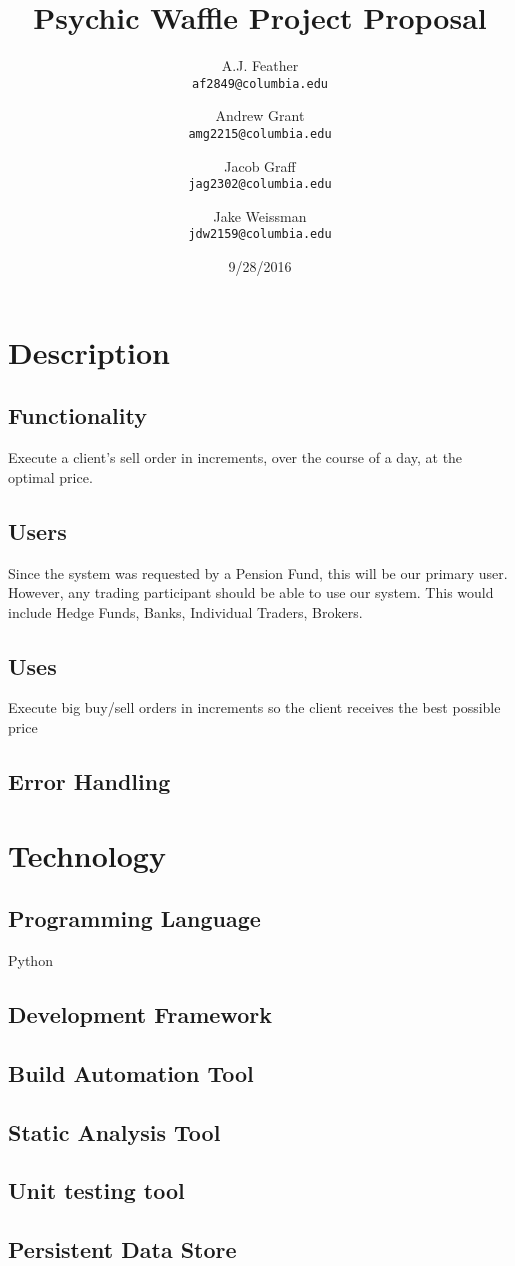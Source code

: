 \documentclass{article}
\title{Psychic Waffle Project Proposal}
\author{
	A.J. Feather\\
	\texttt{af2849@columbia.edu}
	\and
	Andrew Grant\\
	\texttt{amg2215@columbia.edu}
	\and
	Jacob Graff\\
	\texttt{jag2302@columbia.edu}
	\and
	Jake Weissman\\
	\texttt{jdw2159@columbia.edu}
}
\date{9/28/2016}
\begin{document}
\maketitle

\section{Description}

\subsection{Functionality} %
Execute a client's sell order in increments, over the course of a day, at the optimal price. 

\subsection{Users}
Since the system was requested by a Pension Fund, this will be our primary user. However, any trading participant should be able to use our system. This would include Hedge Funds, Banks, Individual Traders, Brokers. 

\subsection{Uses}
Execute big buy/sell orders in increments so the client receives the best possible price

\subsection{Error Handling}

\section{Technology}

\subsection{Programming Language}
Python
\subsection{Development Framework}

\subsection{Build Automation Tool}

\subsection{Static Analysis Tool}

\subsection{Unit testing tool}

\subsection{Persistent Data Store} 
\end{document}
